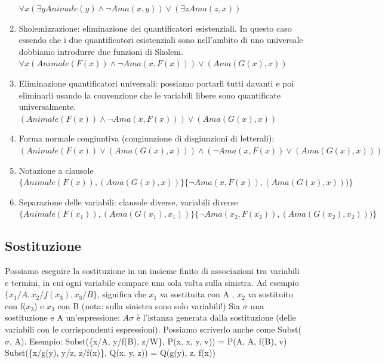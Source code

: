 \documentclass{article}
\begin{document}
\begin{enumerate}
    $\forall x (\exists y Animale(y) \land \neg Ama(x,y)) \lor (\exists z Ama(z, x))$
    \item Skolemizzazione: eliminazione dei quantificatori esistenziali. \newline
    In questo caso essendo che i due quantificatori esistenziali sono nell'ambito di uno universale dobbiamo introdurre due funzioni di Skolem. \newline
    $\forall x (Animale(F(x)) \land \neg Ama(x,F(x))) \lor (Ama(G(x), x))$
    \item Eliminazione quantificatori universali: possiamo portarli tutti davanti e poi eliminarli usando la convenzione che le variabili libere sono quantificate universalmente. \newline
    $(Animale(F(x)) \land \neg Ama(x,F(x))) \lor (Ama(G(x), x))$
    \item Forma normale congiuntiva (congiunzione di disgiunzioni di letterali): \newline
    $(Animale(F(x)) \lor (Ama(G(x), x))) \land (\neg Ama(x,F(x)) \lor (Ama(G(x), x)))$
    \item Notazione a clausole \newline
    $\{Animale(F(x)),(Ama(G(x), x))\} \{\neg Ama(x,F(x)),(Ama(G(x), x)))\}$
    \item Separazione delle variabili: clausole diverse, variabili diverse \newline
    $\{Animale(F(x_1)),(Ama(G(x_1), x_1))\} \{\neg Ama(x_2,F(x_2)),(Ama(G(x_2), x_2)))\}$
\end{enumerate}

\subsection{Sostituzione}
Possiamo eseguire la sostituzione in un insieme finito di associazioni tra variabili e termini, in cui ogni variabile compare una sola volta sulla sinistra. Ad esempio $\{x_1/A, x_2/f(x_3), x_3/B\}$, significa che $x_1$ va sostituita con A , $x_2$ va sostituito con f($x_3$) e $x_3$ con B (nota: sulla sinistra sono solo variabili!)\newline
Sia $\sigma$ una sostituzione e A un'espressione: $A \sigma$ è l'istanza generata dalla sostituzione (delle variabili con le corrispondenti espressioni). Possiamo scriverlo anche come Subst($\sigma$, A). \newline Esempio: \newline
Subst(\{x/A, y/f(B), z/W\}, P(x, x, y, v)) = P(A, A, f(B), v) \newline
Subst(\{x/g(y), y/z, z/f(x)\}, Q(x, y, z)) = Q(g(y), z, f(x))
\end{document}
